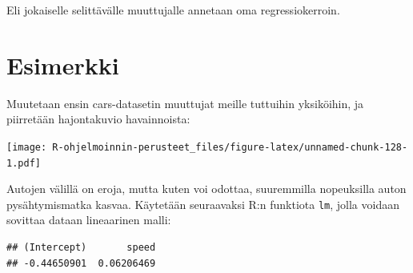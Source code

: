 \documentclass[
]{book}
\newenvironment{Shaded}{\begin{snugshade}}{\end{snugshade}}
\newcommand{\AttributeTok}[1]{\textcolor[rgb]{0.77,0.63,0.00}{#1}}
\newcommand{\CommentTok}[1]{\textcolor[rgb]{0.56,0.35,0.01}{\textit{#1}}}
\newcommand{\FloatTok}[1]{\textcolor[rgb]{0.00,0.00,0.81}{#1}}
\newcommand{\FunctionTok}[1]{\textcolor[rgb]{0.00,0.00,0.00}{#1}}
\newcommand{\NormalTok}[1]{#1}
\newcommand{\OtherTok}[1]{\textcolor[rgb]{0.56,0.35,0.01}{#1}}
\newcommand{\SpecialCharTok}[1]{\textcolor[rgb]{0.00,0.00,0.00}{#1}}
\newcommand{\StringTok}[1]{\textcolor[rgb]{0.31,0.60,0.02}{#1}}
\begin{document}
Eli jokaiselle selittävälle muuttujalle annetaan oma regressiokerroin.

\hypertarget{esimerkki}{%
\section{Esimerkki}\label{esimerkki}}

Muutetaan ensin cars-datasetin muuttujat meille tuttuihin yksiköihin, ja piirretään hajontakuvio havainnoista:

\begin{Shaded}
\end{Shaded}

\texttt{[image: R-ohjelmoinnin-perusteet\_files/figure-latex/unnamed-chunk-128-1.pdf]}

Autojen välillä on eroja, mutta kuten voi odottaa, suuremmilla nopeuksilla auton pysähtymismatka kasvaa. Käytetään seuraavaksi R:n funktiota \texttt{lm}, jolla voidaan sovittaa dataan lineaarinen malli:

\begin{Shaded}
\end{Shaded}

\begin{verbatim}
## (Intercept)       speed 
## -0.44650901  0.06206469
\end{verbatim}
\end{document}
